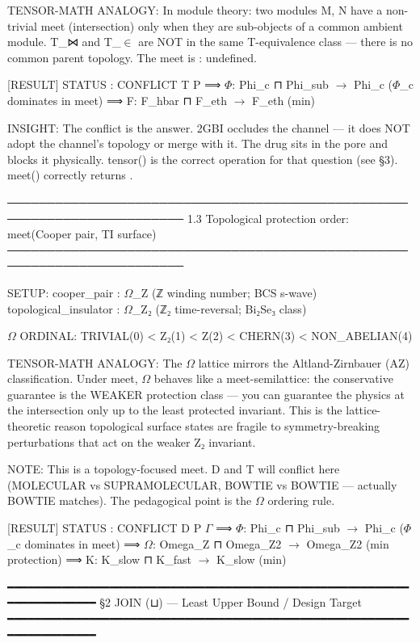 \documentclass[12pt,a4paper]{article}
\begin{document}
TENSOR-MATH ANALOGY:
In module theory: two modules M, N have a non-trivial meet (intersection)
only when they are sub-objects of a common ambient module.
T\_⋈ and T\_$\in$ are NOT in the same T-equivalence class --- there is no
common parent topology. The meet is \perp: undefined.

{[}RESULT{]}
STATUS  : CONFLICT
  T
  P
⟹  $\Phi$: Phi\_c ⊓ Phi\_sub $\rightarrow$ Phi\_c ($\Phi$\_c dominates in meet)
⟹  F: F\_hbar ⊓ F\_eth $\rightarrow$ F\_eth (min)

INSIGHT:
The conflict is the answer. 2GBI occludes the channel --- it does NOT
adopt the channel's topology or merge with it. The drug sits in the
pore and blocks it physically. tensor() is the correct operation
for that question (see §3). meet() correctly returns \perp.

────────────────────────────────────────────────────────────────────────
1.3  Topological protection order: meet(Cooper pair, TI surface)
────────────────────────────────────────────────────────────────────────

SETUP:
cooper\_pair           : $\Omega$\_Z   (ℤ winding number; BCS s-wave)
topological\_insulator : $\Omega$\_Z₂  (ℤ₂ time-reversal; Bi₂Se₃ class)

$\Omega$ ORDINAL:  TRIVIAL(0) \textless{} Z₂(1) \textless{} Z(2) \textless{} CHERN(3) \textless{} NON\_ABELIAN(4)

TENSOR-MATH ANALOGY:
The $\Omega$ lattice mirrors the Altland-Zirnbauer (AZ) classification.
Under meet, $\Omega$ behaves like a meet-semilattice: the conservative
guarantee is the WEAKER protection class --- you can guarantee the
physics at the intersection only up to the least protected invariant.
This is the lattice-theoretic reason topological surface states
are fragile to symmetry-breaking perturbations that act on the
weaker Z₂ invariant.

NOTE: This is a topology-focused meet. D and T will conflict here
(MOLECULAR vs SUPRAMOLECULAR, BOWTIE vs BOWTIE --- actually BOWTIE matches).
The pedagogical point is the $\Omega$ ordering rule.

{[}RESULT{]}
STATUS  : CONFLICT
  D
  P
  $\Gamma$
⟹  $\Phi$: Phi\_c ⊓ Phi\_sub $\rightarrow$ Phi\_c ($\Phi$\_c dominates in meet)
⟹  $\Omega$: Omega\_Z ⊓ Omega\_Z2 $\rightarrow$ Omega\_Z2 (min protection)
⟹  K: K\_slow ⊓ K\_fast $\rightarrow$ K\_slow (min)

━━━━━━━━━━━━━━━━━━━━━━━━━━━━━━━━━━━━━━━━━━━━━━━━━━━━━━━━━━━━━━━━━━━━━━━━
§2  JOIN  (⊔)  ---  Least Upper Bound  /  Design Target
━━━━━━━━━━━━━━━━━━━━━━━━━━━━━━━━━━━━━━━━━━━━━━━━━━━━━━━━━━━━━━━━━━━━━━━━
\end{document}
